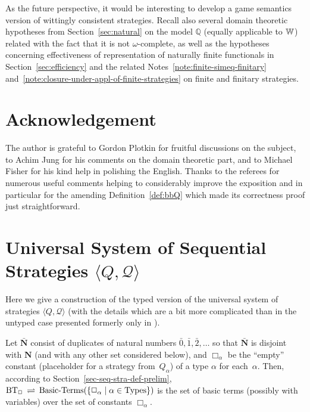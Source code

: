 \documentclass[fleqn]{LMCS}
\theoremstyle{plain}\newtheorem{satz}[thm]{Satz}
\theoremstyle{plain}\newtheorem{hyp}[thm]{Hypothesis}
\theoremstyle{plain}\newtheorem{hyps}[thm]{Hypotheses}
\theoremstyle{definition}\newtheorem{note}[thm]{Note}
\newcommand{\setof}[1]{\{#1\}}
\newcommand{\bYdef}{\mathrel{\BYDEF}}
\newcommand{\BYDEF}{\mbox{$\hspace{.2em}\rightleftharpoons\hspace{.2em}$}}
\newcommand{\la}{\langle}
\newcommand{\ra}{\rangle}
\newcommand{\tuple}[1]{\la #1 \ra}
\newcommand{\NN}{\mathbf{N}}
\newcommand{\bNN}{\bar{\NN}}
\newcommand{\bbQ}{\mathbb{Q}}
\newcommand{\QQ}{{\mathcal Q}}
\newcommand{\?}{\mbox{?}}
\begin{document}
As the future perspective, it would be interesting 
to develop a game semantics version of wittingly consistent strategies. 
Recall also several domain theoretic hypotheses from Section~\ref{sec:natural} 
on the model $\bbQ$ (equally applicable to $\mathbb{W}$) 
related with the fact that it is not $\omega$-complete, as well as the 
hypotheses concerning effectiveness of representation of naturally finite functionals 
in Section~\ref{sec:efficiency} and the related Notes~\ref{note:finite-simeq-finitary} 
and~\ref{note:closure-under-appl-of-finite-strategies} on finite and finitary strategies. 


\section*{Acknowledgement} 

\noindent
The author is grateful to Gordon Plotkin 
for fruitful discussions on the subject, to Achim Jung for his comments on 
the domain theoretic part,  
and to Michael Fisher for his kind help in polishing the English. 
Thanks to the referees for numerous useful comments helping to considerably improve 
the exposition and in particular for the amending Definition~\ref{def:bbQ} 
which made its correctness proof just straightforward. 


















\appendix 
\section{Universal System of Sequential Strategies 
\texorpdfstring{$\tuple{Q,\QQ}$}{}}
\label{appendix:univ-sys-strategies}

\newcommand{\BT}{\mbox{BT}_\Box}
\newcommand{\qq}{q}
\newcommand{\pp}{p}
\newcommand{\type}{\textrm{\bf type}}
\newcommand{\Types}{\textrm{Types}}
\newcommand{\Erase}{\Box}

\noindent
Here we give a construction of the typed version of the universal system of strategies 
$\tuple{Q,\QQ}$ \cite{Saz76SMZH} 
(with the details which are a bit more complicated than in the untyped case 
presented formerly only in \cite{Saz76t}). 

Let $\bNN$ consist of duplicates of natural numbers $\bar{0},\bar{1},\bar{2},\ldots$ 
so that $\bNN$ is disjoint with $\NN$ (and with any other set considered below), 
and $\Box_\alpha$ be the ``empty'' constant (placeholder for a strategy 
from~$Q_\alpha$) of a type $\alpha$ for each~$\alpha$. 
Then, according to Section~\ref{sec-seq-stra-def-prelim}, 
$\BT\bYdef\mbox{Basic-Terms}(\setof{\Box_\alpha\mid\alpha\in\Types})$ 
is the set of basic terms (possibly with variables) over 
the set of constants $\Box_\alpha$. 
\end{document}
